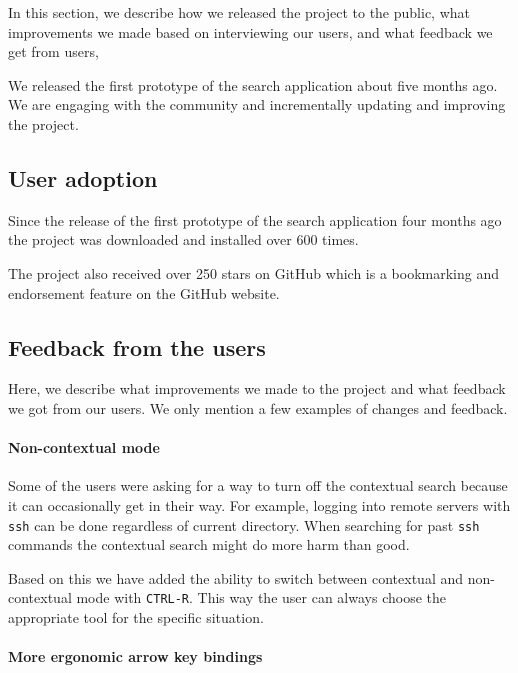 In this section, we describe how we released the project to the public, what improvements we made based on interviewing our users, and what feedback we get from users,

We released the first prototype of the search application about five months ago. We are engaging with the community and incrementally updating and improving the project. 

\subsection{User adoption}

Since the release of the first prototype of the search application four months ago the project was downloaded and installed over 600 times. 

The project also received over 250 stars on GitHub which is a bookmarking and endorsement feature on the GitHub website.\cite{github-stars}



\subsection{Feedback from the users}

Here, we describe what improvements we made to the project and what feedback we got from our users. We only mention a few examples of changes and feedback.

\paragraph{Non-contextual mode}

Some of the users were asking for a way to turn off the contextual search because it can occasionally get in their way. For example, logging into remote servers with \verb|ssh| can be done regardless of current directory. When searching for past \verb|ssh| commands the contextual search might do more harm than good.

Based on this we have added the ability to switch between contextual and non-contextual mode with \verb|CTRL-R|. This way the user can always choose the appropriate tool for the specific situation.


\paragraph{More ergonomic arrow key bindings}

